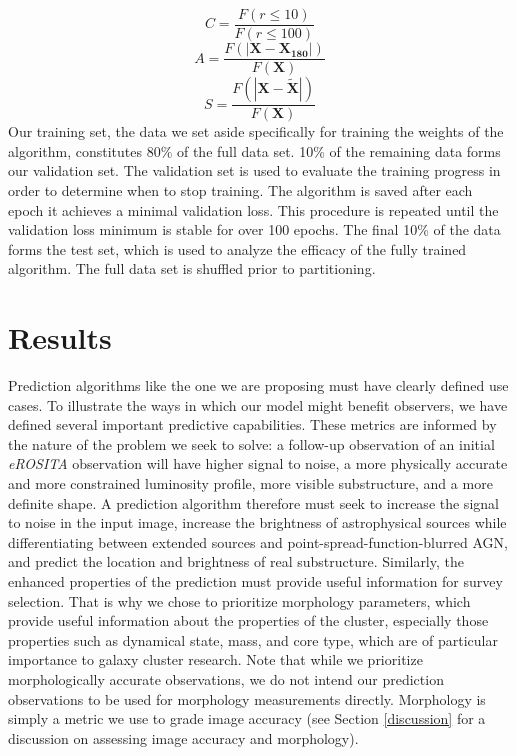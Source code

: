 \documentclass[twocolumn, 11pt]{aastex63}%
\begin{document}
\begin{equation}\label{fixed_c}
    C = \frac{F(r \leq 10)}{F( r \leq 100)}
\end{equation}
\begin{equation}\label{fixed_a}
    A = \frac{F(|\mathbf{X}-\mathbf{X_{180}}|)}{F(\mathbf{X})}
\end{equation}
\begin{equation}\label{fixed_s}
    S = \frac{F(|\mathbf{X}-\mathbf{\tilde{X}}|)}{F(\mathbf{X})}
\end{equation}
Our training set, the data we set aside specifically for training the weights of the algorithm, constitutes 80\% of the full data set. 10\% of the remaining data forms our validation set. The validation set is used to evaluate the training progress in order to determine when to stop training. The algorithm is saved after each epoch it achieves a minimal validation loss. This procedure is repeated until the validation loss minimum is stable for over 100 epochs. The final 10\% of the data forms the test set, which is used to analyze the efficacy of the fully trained algorithm. The full data set is shuffled prior to partitioning.

\section{Results}\label{results}
Prediction algorithms like the one we are proposing must have clearly defined use cases. To illustrate the ways in which our model might benefit observers, we have defined several important predictive capabilities. These metrics are informed by the nature of the problem we seek to solve:  a follow-up observation of an initial \textit{eROSITA} observation will have higher signal to noise, a more physically accurate and more constrained luminosity profile, more visible substructure, and a more definite shape.  A prediction algorithm therefore must seek to increase the signal to noise in the input image, increase the brightness of astrophysical sources while differentiating between extended sources and point-spread-function-blurred AGN, and predict the location and brightness of real substructure. Similarly, the enhanced properties of the prediction must provide useful information for survey selection. That is why we chose to prioritize morphology parameters, which provide useful information about the properties of the cluster, especially those properties such as dynamical state, mass, and core type, which are of particular importance to galaxy cluster research. Note that while we prioritize morphologically accurate observations, we do not intend our prediction observations to be used for morphology measurements directly. Morphology is simply a metric we use to grade image accuracy (see Section \ref{discussion} for a discussion on assessing image accuracy and morphology).
\end{document}
